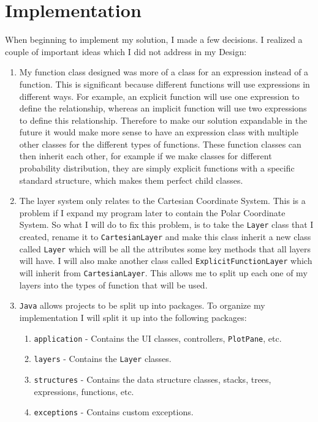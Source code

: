 \documentclass[../../../main.tex]{subfiles}
\begin{document}
\chapter{Implementation}
When beginning to implement my solution, I made a few decisions. I realized a couple of important ideas which I did not address in my Design:
\begin{enumerate}
\item My function class designed was more of a class for an expression instead of a function. This is significant because different functions will use expressions in different ways. For example, an explicit function will use one expression to define the relationship, whereas an implicit function will use two expressions to define this relationship. Therefore to make our solution expandable in the future it would make more sense to have an expression class with multiple other classes for the different types of functions. These function classes can then inherit each other, for example if we make classes for different probability distribution, they are simply explicit functions with a specific standard structure, which makes them perfect child classes.
\item The layer system only relates to the Cartesian Coordinate System. This is a problem if I expand my program later to contain the Polar Coordinate System. So what I will do to fix this problem, is to take the \texttt{Layer} class that I created, rename it to \texttt{CartesianLayer} and make this class inherit a new class called \texttt{Layer} which will be all the attributes some key methods that all layers will have. I will also make another class called \texttt{ExplicitFunctionLayer} which will inherit from \texttt{CartesianLayer}. This allows me to split up each one of my layers into the types of function that will be used.
\item \texttt{Java} allows projects to be split up into packages. To organize my implementation I will split it up into the following packages:
	\begin{enumerate}
	\item \texttt{application} - Contains the UI classes, controllers, \texttt{PlotPane}, etc.
	\item \texttt{layers} - Contains the \texttt{Layer} classes.
	\item \texttt{structures} - Contains the data structure classes, stacks, trees, expressions, functions, etc.
	\item \texttt{exceptions} - Contains custom exceptions.
	\end{enumerate}
\end{enumerate}

\newpage
\end{document}
